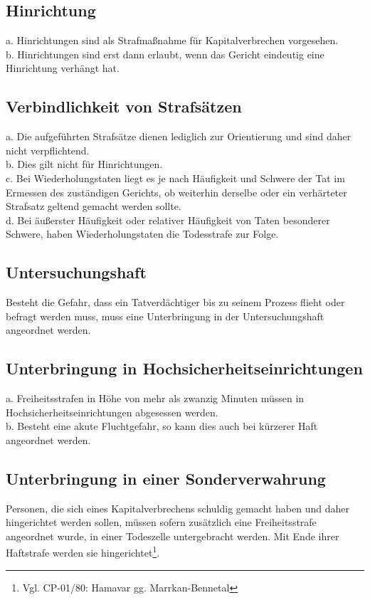 \documentclass{article}
\begin{document}
\subsection{Hinrichtung}
a. Hinrichtungen sind als Strafmaßnahme für Kapitalverbrechen vorgesehen.\\
b. Hinrichtungen sind erst dann erlaubt, wenn das Gericht eindeutig eine Hinrichtung verhängt hat.

\subsection{Verbindlichkeit von Strafsätzen}
a. Die aufgeführten Strafsätze dienen lediglich zur Orientierung und sind daher nicht verpflichtend.\\
b. Dies gilt nicht für Hinrichtungen.\\
c. Bei Wiederholungstaten liegt es je nach Häufigkeit und Schwere der Tat im Ermessen des zuständigen Gerichts, ob weiterhin derselbe oder ein verhärteter Strafsatz geltend gemacht werden sollte.\\
d. Bei äußerster Häufigkeit oder relativer Häufigkeit von Taten besonderer Schwere, haben Wiederholungstaten die Todesstrafe zur Folge.

\subsection{Untersuchungshaft}
Besteht die Gefahr, dass ein Tatverdächtiger bis zu seinem Prozess flieht oder befragt werden muss, muss eine Unterbringung in der Untersuchungshaft angeordnet werden.\\

\subsection{Unterbringung in Hochsicherheitseinrichtungen}
a.	Freiheitsstrafen in Höhe von mehr als zwanzig Minuten müssen in Hochsicherheitseinrichtungen abgesessen werden.\\
b.	Besteht eine akute Fluchtgefahr, so kann dies auch bei kürzerer Haft angeordnet werden.

\subsection{Unterbringung in einer Sonderverwahrung}
Personen, die sich eines Kapitalverbrechens schuldig gemacht haben und daher hingerichtet werden sollen, müssen sofern zusätzlich eine Freiheitsstrafe angeordnet wurde, in einer Todeszelle untergebracht werden. Mit Ende ihrer Haftstrafe werden sie hingerichtet\footnote{Vgl. CP-01/80: Hamavar gg. Marrkan-Bennetal}.
\end{document}
